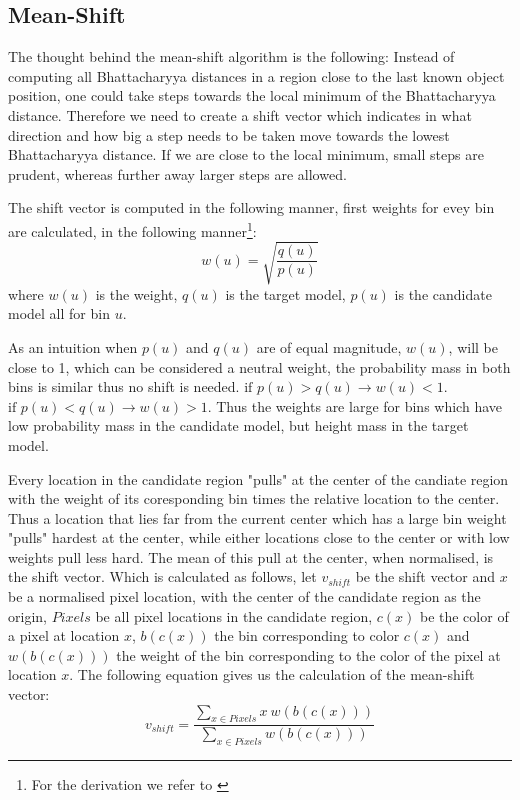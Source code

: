 \documentclass[a4paper,11pt]{article}
\begin{document}
\subsection{Mean-Shift}

The thought behind the mean-shift algorithm is the following: Instead of computing all Bhattacharyya distances in a region close to the last known object position, one could take steps towards the local minimum of the Bhattacharyya distance. Therefore we need to create a shift vector which indicates in what direction and how big a step needs to be taken move towards the lowest Bhattacharyya distance. If we are close to the local minimum, small steps are prudent, whereas further away larger steps are allowed. 

The shift vector is computed in the following manner, first weights for evey bin are calculated, in the following manner\footnote{For the derivation we refer to \cite{mean_shift}\label{fn:derivation_refer}}:
\begin{equation}
\label{eq:weights}
w(u) = \sqrt{\frac{q(u)}{p(u)}}
\end{equation} %
where $w(u)$ is the weight, $q(u)$ is the target model, $p(u)$ is the candidate model all for bin $u$.

As an intuition when $p(u)$ and $q(u)$ are of equal magnitude, $w(u)$, will be close to 1, which can be considered a neutral weight, the probability mass in both bins is similar thus no shift is needed. $\textrm{if }p(u) > q(u) \rightarrow w(u) < 1$.  $\textrm{if }p(u) < q(u) \rightarrow w(u) > 1$. Thus the weights are large for bins  which have low probability mass in the candidate model, but height mass in the target model. 

Every location in the candidate region "pulls" at the center of the candiate region with the weight of its coresponding bin times the relative location to the center. Thus a location that lies far from the current center which has a large bin weight "pulls" hardest at the center, while either locations close to the center or with low weights pull less hard. The mean of this pull at the center, when normalised, is the shift vector. Which is calculated as follows, let $v_{shift}$ be the shift vector and $x$ be a normalised pixel location, with the center of the candidate region as the origin, $Pixels$ be all pixel locations in the candidate region, $c(x)$ be the color of a pixel at location $x$, $b(c(x))$ the bin corresponding to color $c(x)$ and $w(b(c(x)))$ the weight of the bin corresponding to the color of the pixel at location $x$. The following equation gives us the calculation of the mean-shift vector:
\begin{equation}
\label{eq:shift vector}
v_{shift}=\frac{\sum_{x\in Pixels} x \ w(b(c(x)))}{\sum_{x\in Pixels} w(b(c(x)))}
\end{equation} %
\end{document}
